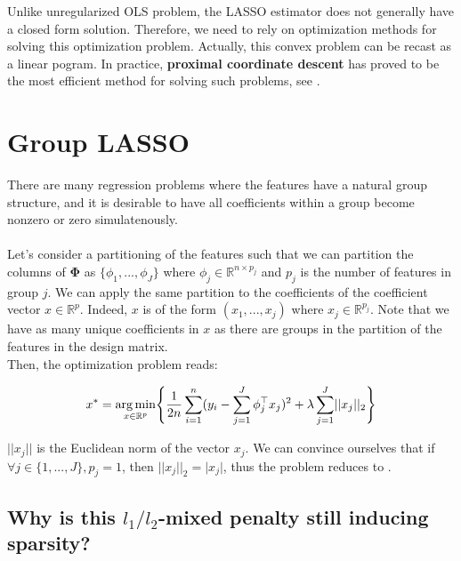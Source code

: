 \documentclass[a4paper,10pt]{article}
\theoremstyle{definition}
\begin{document}
Unlike unregularized OLS problem, the LASSO estimator does not generally have a closed form solution. Therefore, we need to rely on optimization methods for solving this optimization problem. Actually, this convex problem
can be recast as a linear pogram. In practice, \textbf{proximal coordinate descent} has proved to be the most efficient method for solving such problems, see \cite{Bertrand_Massias_Anderson}.

\section{Group LASSO}
\label{section_2}

There are many regression problems where the features have a natural group structure, and it is desirable to have all coefficients within a group become nonzero or zero simulatenously.
\\
\\
Let's consider a partitioning of the features such that we can partition the columns of $\mathbf{\Phi}$ as $\{\phi_{1}, ..., \phi_{J}\}$ where $\phi_{j} \in \mathbb{R}^{n \times p_j}$ and
$p_j$ is the number of features in group $j$. We can apply the same partition to the coefficients of the coefficient vector $x \in \mathbb{R}^p$. Indeed, $x$ is of the form $(x_{1}, ..., x_{j})$ where
$x_{j} \in \mathbb{R}^{p_j}$. Note that we have as many unique coefficients in $x$ as there are groups in the partition of the features in the design matrix.
\\

Then, the optimization problem reads:

\begin{equation*}
    x^* = \operatorname*{arg\,min}_{x \in \mathbb{R}^p} \Biggl\{ \frac{1}{2n} \sum_{i=1}^n (y_i - \sum_{j=1}^J \phi_{j}^\top x_{j})^2 + \lambda \sum_{j=1}^{J} \lvert\lvert x_{j} \rvert\rvert_2 \Biggr\}
\end{equation*}

$\lvert\lvert x_{j} \rvert\rvert$ is the Euclidean norm of the vector $x_{j}$. We can convince ourselves that if $\forall j \in \{1, ..., J\}, p_j = 1$, then $\lvert\lvert x_{j} \rvert\rvert_2 = \lvert x_{j} \rvert$,
thus the problem reduces to .

\subsection*{Why is this $l_1 / l_2$-mixed penalty still inducing sparsity?}
\end{document}
